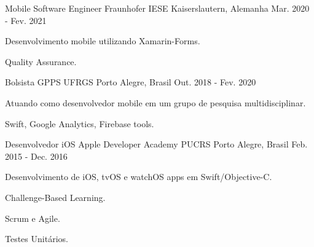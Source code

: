 

\begin{cventries}

  \cventry
    {Mobile Software Engineer} %
    {Fraunhofer IESE} %
    {Kaiserslautern, Alemanha} %
    {Mar. 2020 - Fev. 2021} %
    {
      \begin{cvitems} %
        \item {Desenvolvimento mobile utilizando Xamarin-Forms.}
        \item {Quality Assurance.}
      \end{cvitems}
    }

  \cventry
    {Bolsista} %
    {GPPS UFRGS} %
    {Porto Alegre, Brasil} %
    {Out. 2018 - Fev. 2020} %
    {
      \begin{cvitems} %
        \item {Atuando como desenvolvedor mobile em um grupo de pesquisa multidisciplinar.}
        \item {Swift, Google Analytics, Firebase tools.}
        \end{cvitems}
    }

  \cventry
    {Desenvolvedor iOS} %
    {Apple Developer Academy PUCRS} %
    {Porto Alegre, Brasil} %
    {Feb. 2015 - Dec. 2016} %
    {
      \begin{cvitems} %
        \item {Desenvolvimento de iOS, tvOS e watchOS apps em Swift/Objective-C.}
      \item {Challenge-Based Learning.}
      \item {Scrum e Agile.}
      \item {Testes Unitários.}
      \end{cvitems}
    }

\end{cventries}
